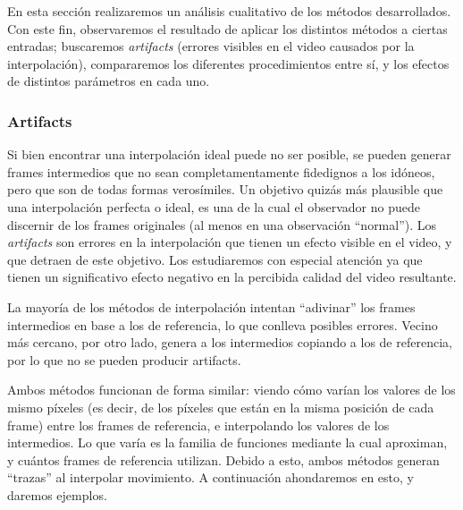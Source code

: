 \par En esta secci\'on realizaremos un an\'alisis cualitativo de los m\'etodos desarrollados.
Con este fin, observaremos el resultado de aplicar los distintos m\'etodos a ciertas entradas; 
buscaremos \textit{artifacts} (errores visibles en el video causados por la interpolaci\'on), compararemos los diferentes procedimientos entre s\'i, y los efectos de distintos par\'ametros en cada uno.

\subsubsection{Artifacts}
\par Si bien encontrar una interpolaci\'on ideal puede no ser posible, se pueden generar frames intermedios que no sean completamentamente fidedignos a los id\'oneos, pero que son de todas formas veros\'imiles.
Un objetivo quiz\'as m\'as plausible que una interpolaci\'on perfecta o ideal, es una de la cual el observador no puede discernir de los frames originales (al menos en una observaci\'on ``normal''). 
Los \textit{artifacts} son errores en la interpolaci\'on que tienen un efecto visible en el video, y que detraen de este objetivo. 
Los estudiaremos con especial atenci\'on ya que tienen un significativo efecto negativo en la percibida calidad del video resultante.

\par La mayor\'ia de los m\'etodos de interpolaci\'on intentan ``adivinar'' los frames intermedios en base a los de referencia, lo que conlleva posibles errores.
Vecino m\'as cercano, por otro lado, genera a los intermedios copiando a los de referencia, por lo que no se pueden producir artifacts.

\par Ambos m\'etodos funcionan de forma similar: viendo c\'omo var\'ian los valores de los mismo p\'ixeles (es decir, de los p\'ixeles que est\'an en la misma posici\'on de cada frame) entre los frames de referencia, e interpolando los valores de los intermedios.
Lo que var\'ia es la familia de funciones mediante la cual aproximan, y cu\'antos frames de referencia utilizan.
Debido a esto, ambos m\'etodos generan ``trazas'' al interpolar movimiento.
A continuaci\'on ahondaremos en esto, y daremos ejemplos.

